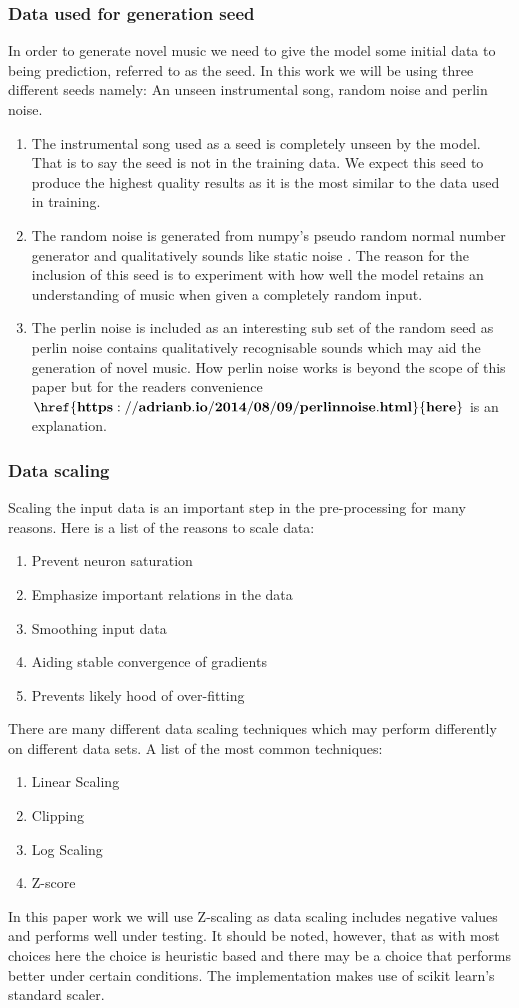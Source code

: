 \documentclass{article}
\begin{document}
\subsubsection{Data used for generation seed}
In order to generate novel music we need to give the model some initial data to being prediction, referred to as the seed. In this work we will be using three different seeds namely: An unseen instrumental song, random noise and perlin noise.
\begin{enumerate}
\item The instrumental song used as a seed is completely unseen by the model. That is to say the seed is not in the training data. We expect this seed to produce the highest quality results as it is the most similar to the data used in training.
\item The random noise is generated from numpy's pseudo random normal number generator and qualitatively sounds like static noise \cite{harris2020array}. The reason for the inclusion of this seed is to experiment with how well the model retains an understanding of music when given a completely random input.
\item The perlin noise is included as an interesting sub set of the random seed as perlin noise contains qualitatively recognisable sounds which may aid the generation of novel music. How perlin noise works is beyond the scope of this paper but for the readers convenience $\mathbf{\href{https://adrianb.io/2014/08/09/perlinnoise.html}{here}}$ is an explanation.
\end{enumerate}

\pagebreak

\subsubsection{Data scaling}
Scaling the input data is an important step in the pre-processing for many reasons. Here is a list of the reasons to scale data:
\begin{enumerate}
\item Prevent neuron saturation
\item Emphasize important relations in the data
\item Smoothing input data 
\item Aiding stable convergence of gradients
\item Prevents likely hood of over-fitting
\end{enumerate}
There are many different data scaling techniques which may perform differently on different data sets. A list of the most common techniques:
\begin{enumerate}
\item Linear Scaling
\item Clipping 
\item Log Scaling
\item Z-score
\end{enumerate}
In this paper work we will use Z-scaling as data scaling includes negative values and performs well under testing. It should be noted, however, that as with most choices here the choice is heuristic based and there may be a choice that performs better under certain conditions. The implementation makes use of scikit learn's standard scaler\cite{scikit-learn}.
\end{document}

